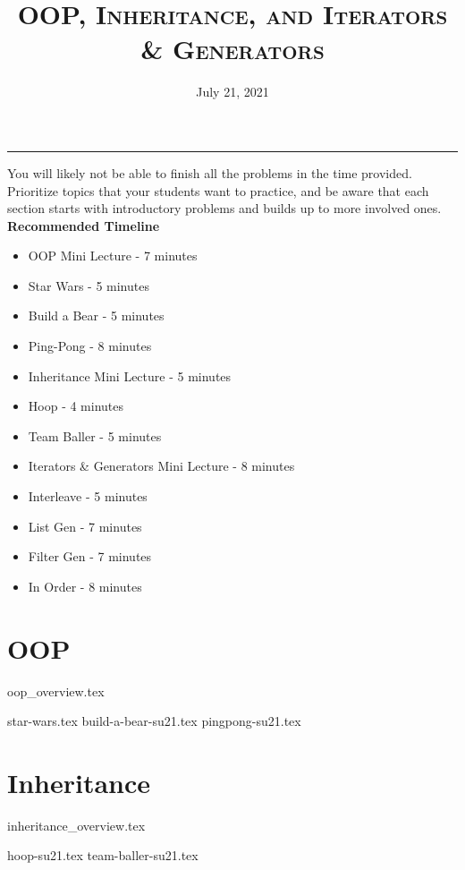 \documentclass{exam}
\title{\textsc{OOP, Inheritance, and Iterators \& Generators}}
\date{July 21, 2021}
\begin{document}
\maketitle
\rule{\textwidth}{0.15em}
\fontsize{12}{15}\selectfont


\begin{guide}
    You will likely not be able to finish all the problems in the time provided. Prioritize topics that your students want to practice, 
    and be aware that each section starts with introductory problems and builds up to more involved ones.
    \newline
    \textbf{Recommended Timeline}
    \begin{itemize}
        \item OOP Mini Lecture - 7 minutes
        \item Star Wars - 5 minutes
        \item Build a Bear - 5 minutes
        \item Ping-Pong - 8 minutes
        \item Inheritance Mini Lecture - 5 minutes
        \item Hoop - 4 minutes
        \item Team Baller - 5 minutes
        \item Iterators \& Generators Mini Lecture - 8 minutes
        \item Interleave - 5 minutes
        \item List Gen - 7 minutes
        \item Filter Gen - 7 minutes
        \item In Order - 8 minutes
    \end{itemize}
\end{guide}

\section{OOP}
{oop_overview.tex}
\newpage
\begin{questions}
{star-wars.tex}
{build-a-bear-su21.tex}
{pingpong-su21.tex}
\end{questions}

\newpage
\section{Inheritance}
{inheritance_overview.tex}
\begin{questions}
{hoop-su21.tex}
{team-baller-su21.tex}
\end{questions}
\end{document}
